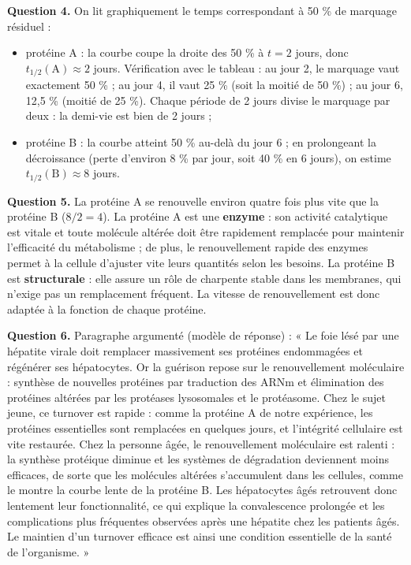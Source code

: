 \documentclass[11pt]{article}
\begin{document}
\begin{exoresolu}
\textbf{Question 4.} On lit graphiquement le temps correspondant à 50 \% de marquage résiduel :
\begin{itemize}
\item protéine A : la courbe coupe la droite des 50 \% à $t = 2$ jours, donc $t_{1/2}(\mathrm{A}) \approx 2$ jours. Vérification avec le tableau : au jour 2, le marquage vaut exactement 50 \% ; au jour 4, il vaut 25 \% (soit la moitié de 50 \%) ; au jour 6, 12,5 \% (moitié de 25 \%). Chaque période de 2 jours divise le marquage par deux : la demi-vie est bien de 2 jours ;
\item protéine B : la courbe atteint 50 \% au-delà du jour 6 ; en prolongeant la décroissance (perte d'environ 8 \% par jour, soit 40 \% en 6 jours), on estime $t_{1/2}(\mathrm{B}) \approx 8$ jours.
\end{itemize}

\textbf{Question 5.} La protéine A se renouvelle environ quatre fois plus vite que la protéine B ($8 / 2 = 4$). La protéine A est une \textbf{enzyme} : son activité catalytique est vitale et toute molécule altérée doit être rapidement remplacée pour maintenir l'efficacité du métabolisme ; de plus, le renouvellement rapide des enzymes permet à la cellule d'ajuster vite leurs quantités selon les besoins. La protéine B est \textbf{structurale} : elle assure un rôle de charpente stable dans les membranes, qui n'exige pas un remplacement fréquent. La vitesse de renouvellement est donc adaptée à la fonction de chaque protéine.

\textbf{Question 6.} Paragraphe argumenté (modèle de réponse) : « Le foie lésé par une hépatite virale doit remplacer massivement ses protéines endommagées et régénérer ses hépatocytes. Or la guérison repose sur le renouvellement moléculaire : synthèse de nouvelles protéines par traduction des ARNm et élimination des protéines altérées par les protéases lysosomales et le protéasome. Chez le sujet jeune, ce turnover est rapide : comme la protéine A de notre expérience, les protéines essentielles sont remplacées en quelques jours, et l'intégrité cellulaire est vite restaurée. Chez la personne âgée, le renouvellement moléculaire est ralenti : la synthèse protéique diminue et les systèmes de dégradation deviennent moins efficaces, de sorte que les molécules altérées s'accumulent dans les cellules, comme le montre la courbe lente de la protéine B. Les hépatocytes âgés retrouvent donc lentement leur fonctionnalité, ce qui explique la convalescence prolongée et les complications plus fréquentes observées après une hépatite chez les patients âgés. Le maintien d'un turnover efficace est ainsi une condition essentielle de la santé de l'organisme. »
\end{exoresolu}
\end{document}
